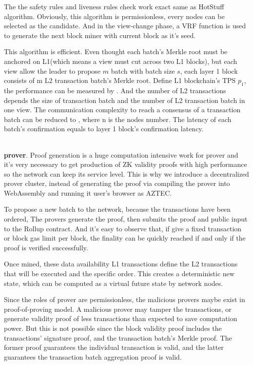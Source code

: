 \documentclass{article}
\begin{document}
The the safety rules and liveness rules check work exact same as HotStuff algorithm. Obviously, this algorithm is permissionless, every nodes can be selected as the candidate. And in the view-change phase, a VRF function is used to generate the next block miner with current block as it's seed.

This algorithm is efficient. Even thought each batch's Merkle root must be anchored on L1(which means a view must cut across two L1 blocks), but each view allow the leader to propose $m$ batch with batch size $s$, each layer 1 block consists of m L2 transaction batch's Merkle root. Define L1 blockchain's TPS $p_1$, the performance can be measured by . And the number of L2 transactions depends the size of transaction batch and the number of L2 transaction batch in one view. The communication complexity to reach a consensus of a transaction batch can be reduced to , where n is the nodes number. The latency of each batch's confirmation equals to layer 1 block's confirmation latency.

~\\
\noindent\textbf{prover}. Proof generation is a huge computation intensive work for prover and it's very necessary to get production of ZK validity proofs with high performance so the network can keep its service level. This is why we introduce a decentralized prover cluster, instead of generating the proof via compiling the prover into WebAssembly and running it user's browser as AZTEC.

To propose a new batch to the network, because the transactions have been ordered, The provers generate the proof, then submits the proof and public input to the Rollup contract. And it's easy to observe that, if give a fixed transaction or block gas limit per block, the finality can be quickly reached if and only if the proof is verified successfully.

Once mined, these data availability L1 transactions define the L2 transactions that will be executed and the specific order. This creates a deterministic new state, which can be computed as a virtual future state by network nodes.

Since the roles of prover are permissionless, the malicious provers maybe exist in proof-of-proving model. A malicious prover may tamper the transactions, or generate validity proof of less transactions than expected to save computation power. But this is not possible  since the block validity proof includes the transactions' signature proof, and the transaction batch's Merkle proof. The former proof guarantees the individual transaction is valid, and the latter guarantees the transaction batch aggregation proof is valid. 
\end{document}
